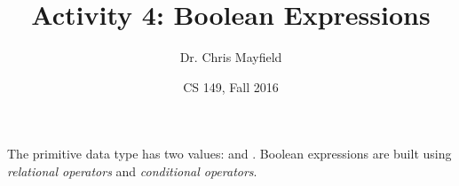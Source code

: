 \documentclass[12pt]{article}
\title{Activity 4: Boolean Expressions}
\author{Dr. Chris Mayfield}
\date{CS 149, Fall 2016}
\begin{document}
\maketitle

The primitive data type  has two values:  and .
Boolean expressions are built using \emph{relational operators} and \emph{conditional operators}.



\newpage

\newpage

\end{document}
